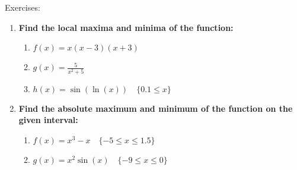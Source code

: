 \documentclass[../revisedmain.tex]{subfiles}
\begin{document}
\begin{center}
	{\Large Exercises:}
\end{center}
\begin{enumerate}
	\item \textbf{Find the local maxima and minima of the function:}
	\begin{enumerate}
		\item $f(x)=x(x-3)(x+3)$
		\item $g(x)=\displaystyle\frac{5}{x^2+5}$
		\item $h(x)=\sin(\ln(x))\quad\{0.1\le x\}$
	\end{enumerate}
	\item \textbf{Find the absolute maximum and minimum of the function on the given interval:}
	\begin{enumerate}
		\item $f(x)=x^3-x\quad\{-5\le x\le 1.5 \}$
		\item $g(x)=x^2\sin(x)\quad\{-9\le x\le 0 \}$
	\end{enumerate}
\end{enumerate}
\end{document}
